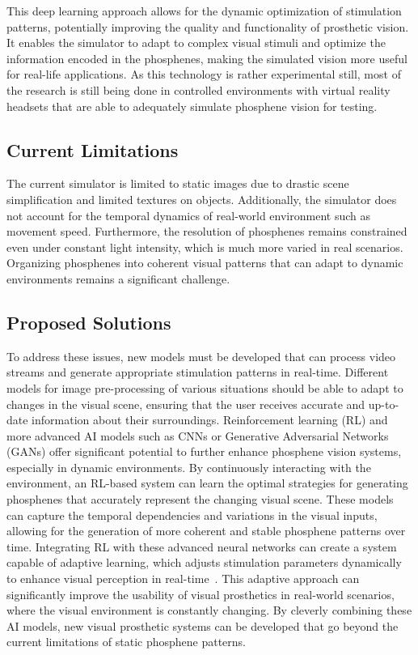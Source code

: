 \documentclass[10pt]{article}
\begin{document}
This deep learning approach allows for the dynamic optimization of stimulation
patterns, potentially improving the quality and functionality of prosthetic
vision. It enables the simulator to adapt to complex visual stimuli and optimize
the information encoded in the phosphenes, making the simulated vision more
useful for real-life applications. As this technology is rather experimental
still, most of the research is still being done in controlled environments with
virtual reality headsets that are able to adequately simulate phosphene vision
for testing.

\subsection*{Current Limitations}\label{subsec:limitations}
The current simulator is limited to static images due to drastic scene
simplification and limited textures on objects. Additionally, the simulator does
not account for the temporal dynamics of real-world environment such as movement
speed. Furthermore, the resolution of phosphenes remains constrained even under
constant light intensity, which is much more varied in real scenarios.
Organizing phosphenes into coherent visual patterns that can adapt to dynamic
environments remains a significant challenge.

\subsection*{Proposed Solutions}\label{subsec:solutions}
To address these issues, new models must be developed that can process video
streams and generate appropriate stimulation patterns in real-time. Different
models for image pre-processing of various situations should be able to adapt to
changes in the visual scene, ensuring that the user receives accurate and
up-to-date information about their surroundings. Reinforcement learning (RL) and
more advanced AI models such as CNNs or Generative Adversarial Networks (GANs)
offer significant potential to further enhance phosphene vision systems,
especially in dynamic environments. By continuously interacting with the
environment, an RL-based system can learn the optimal strategies for generating
phosphenes that accurately represent the changing visual scene. These models can
capture the temporal dependencies and variations in the visual inputs, allowing
for the generation of more coherent and stable phosphene patterns over time.
Integrating RL with these advanced neural networks can create a system capable
of adaptive learning, which adjusts stimulation parameters dynamically to
enhance visual perception in real-time~\parencite{hanDeepLearningBased2021}.
This adaptive approach can significantly improve the usability of visual
prosthetics in real-world scenarios, where the visual environment is constantly
changing. By cleverly combining these AI models, new visual prosthetic systems
can be developed that go beyond the current limitations of static phosphene
patterns.
\end{document}
